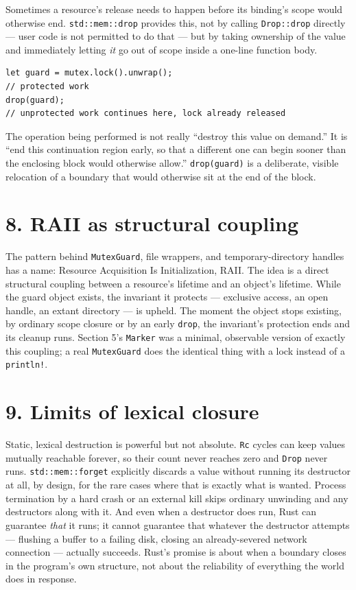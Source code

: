 \documentclass[11pt]{book}
\begin{document}
Sometimes a resource's release needs to happen before its binding's scope would otherwise end. \texttt{std::mem::drop} provides this, not by calling \texttt{Drop::drop} directly --- user code is not permitted to do that --- but by taking ownership of the value and immediately letting \emph{it} go out of scope inside a one-line function body.

\begin{lstlisting}
let guard = mutex.lock().unwrap();
// protected work
drop(guard);
// unprotected work continues here, lock already released
\end{lstlisting}

The operation being performed is not really ``destroy this value on demand.'' It is ``end this continuation region early, so that a different one can begin sooner than the enclosing block would otherwise allow.'' \texttt{drop(guard)} is a deliberate, visible relocation of a boundary that would otherwise sit at the end of the block.

\section*{8. RAII as structural coupling}

The pattern behind \texttt{MutexGuard}, file wrappers, and temporary-directory handles has a name: Resource Acquisition Is Initialization, RAII. The idea is a direct structural coupling between a resource's lifetime and an object's lifetime. While the guard object exists, the invariant it protects --- exclusive access, an open handle, an extant directory --- is upheld. The moment the object stops existing, by ordinary scope closure or by an early \texttt{drop}, the invariant's protection ends and its cleanup runs. Section 5's \texttt{Marker} was a minimal, observable version of exactly this coupling; a real \texttt{MutexGuard} does the identical thing with a lock instead of a \texttt{println!}.

\section*{9. Limits of lexical closure}

Static, lexical destruction is powerful but not absolute. \texttt{Rc} cycles can keep values mutually reachable forever, so their count never reaches zero and \texttt{Drop} never runs. \texttt{std::mem::forget} explicitly discards a value without running its destructor at all, by design, for the rare cases where that is exactly what is wanted. Process termination by a hard crash or an external kill skips ordinary unwinding and any destructors along with it. And even when a destructor does run, Rust can guarantee \emph{that} it runs; it cannot guarantee that whatever the destructor attempts --- flushing a buffer to a failing disk, closing an already-severed network connection --- actually succeeds. Rust's promise is about when a boundary closes in the program's own structure, not about the reliability of everything the world does in response.
\end{document}
